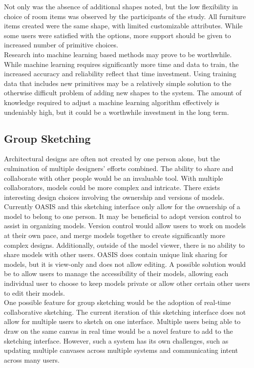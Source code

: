 Not only was the absence of additional shapes noted, but the low flexibility in choice of room items was observed by the participants of the study. All furniture items created were the same shape, with limited customizable attributes. While some users were satisfied with the options, more support should be given to increased number of primitive choices. \\

Research into machine learning based methods may prove to be worthwhile. While machine learning requires significantly more time and data to train, the increased accuracy and reliability reflect that time investment. Using training data that includes new primitives may be a relatively simple solution to the otherwise difficult problem of adding new shapes to the system. The amount of knowledge required to adjust a machine learning algorithm effectively is undeniably high, but it could be a worthwhile investment in the long term.

\subsection{Group Sketching}
Architectural designs are often not created by one person alone, but the culmination of multiple designers' efforts combined. The ability to share and collaborate with other people would be an invaluable tool. With multiple collaborators, models could be more complex and intricate. There exists interesting design choices involving the ownership and versions of models. \\

Currently OASIS and this sketching interface only allow for the ownership of a model to belong to one person. It may be beneficial to adopt version control to assist in organizing models. Version control would allow users to work on models at their own pace, and merge models together to create significantly more complex designs. Additionally, outside of the model viewer, there is no ability to share models with other users. OASIS does contain unique link sharing for models, but it is view-only and does not allow editing. A possible solution would be to allow users to manage the accessibility of their models, allowing each individual user to choose to keep models private or allow other certain other users to edit their models. \\

One possible feature for group sketching would be the adoption of real-time collaborative sketching. The current iteration of this sketching interface does not allow for multiple users to sketch on one interface. Multiple users being able to draw on the same canvas in real time would be a novel feature to add to the sketching interface. However, such a system has its own challenges, such as updating multiple canvases across multiple systems and communicating intent across many users.

